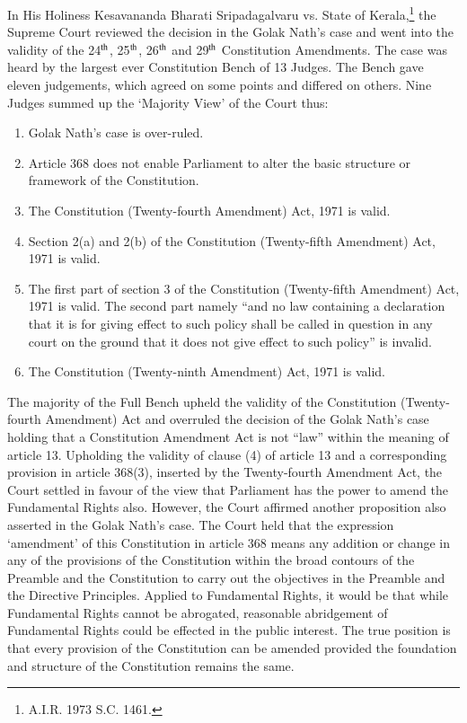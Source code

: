 \begin{multicols}{2}
\noi
In His Holiness Kesavananda Bharati Sripadagalvaru vs. State of Kerala,\footnote{A.I.R. 1973 S.C. 1461.} the Supreme Court
reviewed the decision in the Golak Nath’s case and went into the validity of the 24$^{\rm th}$, 25$^{\rm th}$, 26$^{\rm th}$
and 29$^{\rm th}$ Constitution Amendments. The case was heard by the largest ever Constitution Bench
of 13 Judges. The Bench gave eleven judgements, which agreed on some points and differed
on others. Nine Judges summed up the ‘Majority View’ of the Court thus:

\vspace{-.3cm}

\begin{enumerate}
\itemsep=0pt
\item Golak Nath’s case is over-ruled.

\item Article 368 does not enable Parliament to alter the basic structure or framework of the Constitution. 

\item The Constitution (Twenty-fourth Amendment) Act, 1971 is valid.

\item Section 2(a) and 2(b) of the Constitution (Twenty-fifth Amendment) Act, 1971 is valid.

\item The first part of section 3 of the Constitution (Twenty-fifth Amendment) Act, 1971 is
valid. The second part namely “and no law containing a declaration that it is for giving effect
to such policy shall be called in question in any court on the ground that it does not give effect
to such policy” is invalid.

\item The Constitution (Twenty-ninth Amendment) Act, 1971 is valid.
\end{enumerate}

\vspace{-.3cm}

\noi
The majority of the Full Bench upheld the validity of the Constitution (Twenty-fourth
Amendment) Act and overruled the decision of the Golak Nath’s case holding that a
Constitution Amendment Act is not “law” within the meaning of article 13. Upholding the
validity of clause (4) of article 13 and a corresponding provision in article 368(3), inserted by
the Twenty-fourth Amendment Act, the Court settled in favour of the view that Parliament
has the power to amend the Fundamental Rights also. However, the Court affirmed another
proposition also asserted in the Golak Nath’s case. The Court held that the expression
‘amendment’ of this Constitution in article 368 means any addition or change in any of the
provisions of the Constitution within the broad contours of the Preamble and the Constitution
to carry out the objectives in the Preamble and the Directive Principles. Applied to
Fundamental Rights, it would be that while Fundamental Rights cannot be abrogated,
reasonable abridgement of Fundamental Rights could be effected in the public interest. The
true position is that every provision of the Constitution can be amended provided the
foundation and structure of the Constitution remains the same.


\end{multicols}
